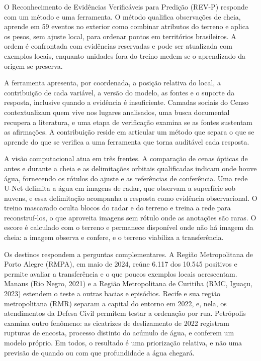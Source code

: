 \documentclass[conference]{IEEEtran}
\begin{document}
O Reconhecimento de Evidências Verificáveis para Predição (REV-P) responde com um método e uma ferramenta. O método qualifica observações de cheia, aprende em 59 eventos no exterior como combinar atributos do terreno e aplica os pesos, sem ajuste local, para ordenar pontos em territórios brasileiros. A ordem é confrontada com evidências reservadas e pode ser atualizada com exemplos locais, enquanto unidades fora do treino medem se o aprendizado da origem se preserva.

A ferramenta apresenta, por coordenada, a posição relativa do local, a contribuição de cada variável, a versão do modelo, as fontes e o suporte da resposta, inclusive quando a evidência é insuficiente. Camadas sociais do Censo contextualizam quem vive nos lugares analisados, uma busca documental recupera a literatura, e uma etapa de verificação examina se as fontes sustentam as afirmações. A contribuição reside em articular um método que separa o que se aprende do que se verifica a uma ferramenta que torna auditável cada resposta.

A visão computacional atua em três frentes. A comparação de cenas ópticas de antes e durante a cheia e as delimitações orbitais qualificadas indicam onde houve água, fornecendo os rótulos do ajuste e as referências de conferência. Uma rede U-Net delimita a água em imagens de radar, que observam a superfície sob nuvens, e essa delimitação acompanha a resposta como evidência observacional. O treino mascarado oculta blocos do radar e do terreno e treina a rede para reconstruí-los, o que aproveita imagens sem rótulo onde as anotações são raras. O escore é calculado com o terreno e permanece disponível onde não há imagem da cheia: a imagem observa e confere, e o terreno viabiliza a transferência.

\vspace{-3pt}
Os destinos respondem a perguntas complementares. A Região Metropolitana de Porto Alegre (RMPA), em maio de 2024, reúne 6.117 dos 10.545 positivos e permite avaliar a transferência e o que poucos exemplos locais acrescentam. Manaus (Rio Negro, 2021) e a Região Metropolitana de Curitiba (RMC, Iguaçu, 2023) estendem o teste a outras bacias e episódios. Recife e sua região metropolitana (RMR) separam a capital do entorno em 2022, e, nela, os atendimentos da Defesa Civil permitem testar a ordenação por rua. Petrópolis examina outro fenômeno: as cicatrizes de deslizamento de 2022 registram rupturas de encosta, processo distinto do acúmulo de água, e conferem um modelo próprio. Em todos, o resultado é uma priorização relativa, e não uma previsão de quando ou com que profundidade a água chegará.
\end{document}
